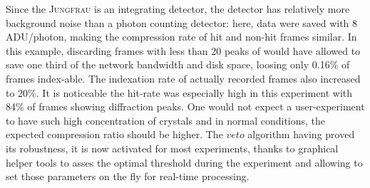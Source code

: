\documentclass[preprint]{iucr}              %
\begin{document}

Since the \textsc{Jungfrau} is an integrating detector, the detector has relatively more background noise than a photon counting detector: here, data were saved with 8 ADU/photon, making the compression rate of hit and non-hit frames similar.
In this example, discarding frames with less than 20 peaks of would have allowed to save one third of the network bandwidth and disk space, loosing only 0.16\% of frames index-able. 
The indexation rate of actually recorded frames also increased to 20\%.
It is noticeable the hit-rate was especially high in this experiment with 84\% of frames showing diffraction peaks.
One would not expect a user-experiment to have such high concentration of crystals and in normal conditions, the expected compression ratio should be higher.
The $veto$ algorithm having proved its robustness, it is now activated for most experiments, thanks to graphical helper tools to asses the optimal threshold during the experiment and allowing to set those parameters on the fly for real-time processing.
\end{document}
